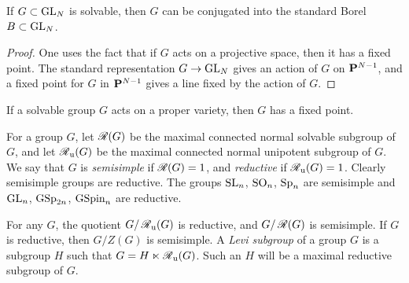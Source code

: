 \begin{theo}
If $G\subset \operatorname{GL}_N$ is solvable, then $G$ can be conjugated 
into the standard Borel $B\subset \operatorname{GL}_N$. 
\end{theo}
\begin{proof}
One uses the fact that if $G$ acts on a projective space, then it has a fixed 
point. The standard representation $G\to \operatorname{GL}_N$ gives an action of 
$G$ on $\mathbf{P}^{N-1}$, and a fixed point for $G$ in $\mathbf{P}^{N-1}$ gives a line fixed 
by the action of $G$. 
\end{proof}

\begin{theo}[Borel]
If a solvable group $G$ acts on a proper variety, then $G$ has a fixed point. 
\end{theo}

For a group $G$, let $\operatorname{\mathscr{R}}(G)$ be the maximal connected normal solvable 
subgroup of $G$, and let $\operatorname{\mathscr{R}}_{\mathrm{u}}(G)$ be the maximal connected normal 
unipotent subgroup of $G$. We say that $G$ is \emph{semisimple} if 
$\operatorname{\mathscr{R}}(G)=1$, and \emph{reductive} if $\operatorname{\mathscr{R}}_{\mathrm{u}}(G)=1$. Clearly 
semisimple groups are reductive. The groups 
$\operatorname{SL}_n$, $\operatorname{SO}_n$, $\operatorname{Sp}_n$ are semisimple 
and $\operatorname{GL}_n$, $\operatorname{GSp}_{2 n}$, $\operatorname{GSpin}_n$ are 
reductive. 

For any $G$, the quotient $G/\operatorname{\mathscr{R}}_{\mathrm{u}}(G)$ is reductive, and 
$G/\operatorname{\mathscr{R}}(G)$ is semisimple. If $G$ is reductive, then $G/Z(G)$ is 
semisimple. A \emph{Levi subgroup} of a group $G$ is a subgroup $H$ such 
that $G=H\ltimes \operatorname{\mathscr{R}}_{\mathrm{u}} (G)$. Such an $H$ will be a maximal 
reductive subgroup of $G$. 




